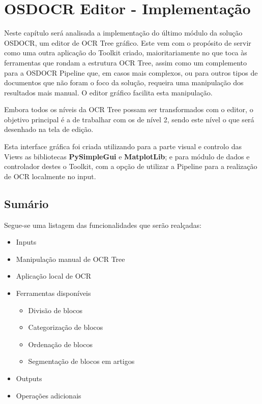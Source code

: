 \chapter{OSDOCR Editor - Implementação}
\label{cap_osdocr_editor_implementacao}



Neste capítulo será analisada a implementação do último módulo da solução OSDOCR, um editor de OCR Tree gráfico. Este vem com o propósito de servir como uma outra aplicação do Toolkit criado, maioritariamente no que toca às ferramentas que rondam a estrutura OCR Tree, assim como um complemento para a OSDOCR Pipeline que, em casos mais complexos, ou para outros tipos de documentos que não foram o foco da solução, requeira uma manipulação dos resultados mais manual. O editor gráfico facilita esta manipulação.

Embora todos os níveis da OCR Tree possam ser transformados com o editor, o objetivo principal é a de trabalhar com os de nível 2, sendo este nível o que será desenhado na tela de edição.

Esta interface gráfica foi criada utilizando para a parte visual e controlo das Views as bibliotecas \textbf{PySimpleGui} e \textbf{MatplotLib}; e para módulo de dados e controlador destes o Toolkit, com a opção de utilizar a Pipeline para a realização de OCR localmente no input.


\section{Sumário}

Segue-se uma listagem das funcionalidades que serão realçadas:

\begin{itemize}\setlength\itemsep{-0.8em}
	
	\item Inputs
	\item Manipulação manual de OCR Tree 
	\item Aplicação local de OCR
	\item Ferramentas disponíveis
		\begin{itemize}\setlength\itemsep{-0.8em}
			\item Divisão de blocos
			\item Categorização de blocos
			\item Ordenação de blocos
			\item Segmentação de blocos em artigos
		\end{itemize}
	\item Outputs
	\item Operações adicionais
\end{itemize}

